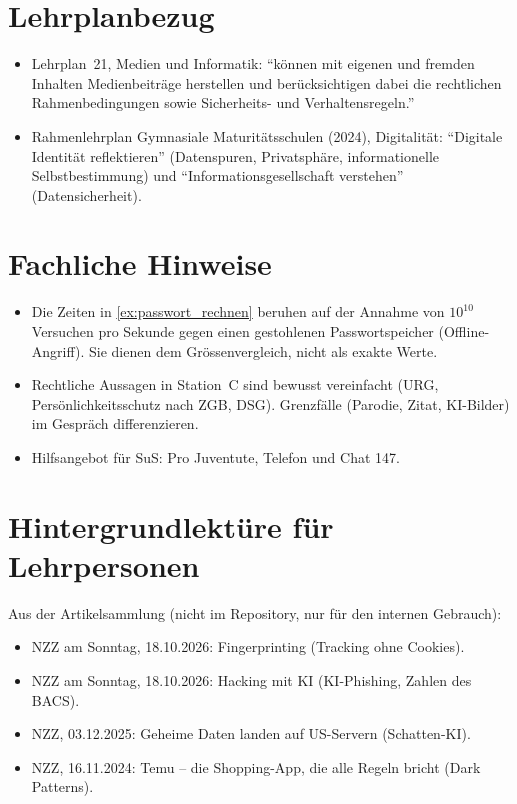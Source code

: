 \section{Lehrplanbezug}

\begin{itemize}
	\item Lehrplan~21, Medien und Informatik: \enquote{können mit eigenen und fremden Inhalten Medien\-bei\-träge herstellen und berücksichtigen dabei die rechtlichen Rahmenbedingungen sowie Sicher\-heits- und Ver\-hal\-tens\-re\-geln.}
	\item Rahmenlehrplan Gymnasiale Ma\-tu\-ri\-täts\-schu\-len (2024), Digitalität: \enquote{Digitale Identität reflektieren} (Datenspuren, Privatsphäre, informationelle Selbstbestimmung) und \enquote{Informationsgesellschaft verstehen} (Datensicherheit).
\end{itemize}

\section{Fachliche Hinweise}

\begin{itemize}
	\item Die Zeiten in \cref{ex:passwort_rechnen} beruhen auf der Annahme von $10^{10}$ Versuchen pro Sekunde gegen einen gestohlenen Passwortspeicher (Offline-Angriff). Sie dienen dem Grössenvergleich, nicht als exakte Werte.
	\item Rechtliche Aussagen in Station~C sind bewusst vereinfacht (\gls{URG}, Persönlichkeitsschutz nach \gls{ZGB}, \gls{DSG}). Grenzfälle (Parodie, Zitat, KI-Bilder) im Gespräch differenzieren.
	\item Hilfsangebot für SuS: Pro Juventute, Telefon und Chat 147.
\end{itemize}

\section{Hintergrundlektüre für Lehrpersonen}

Aus der Artikelsammlung (nicht im Repository, nur für den internen Gebrauch):
\begin{itemize}
	\item NZZ am Sonntag, 18.10.2026: Fingerprinting (Tracking ohne Cookies).
	\item NZZ am Sonntag, 18.10.2026: Hacking mit KI (KI-Phishing, Zahlen des BACS).
	\item NZZ, 03.12.2025: Geheime Daten landen auf US-Servern (Schatten-KI).
	\item NZZ, 16.11.2024: Temu -- die Shopping-App, die alle Regeln bricht (Dark Patterns).
\end{itemize}
